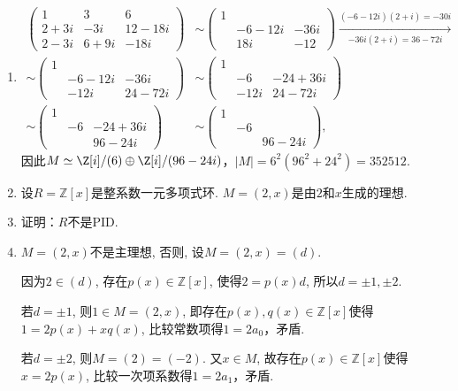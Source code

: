 \begin{enumerate}
    \item[\textbf{证明:}]
    \begin{align*}
        \begin{pmatrix}1&3&6\\2+3i&-3i&12-18i\\2-3i&6+9i&-18i\end{pmatrix}
        &\sim\begin{pmatrix}1& & \\ &-6-12i&-36i\\ &18i&-12\end{pmatrix}
        \xrightarrow[-36i(2+i)=36-72i]{(-6-12i)(2+i)=-30i}\\
        \sim\begin{pmatrix}1& & \\ &-6-12i&-36i\\ &-12i&24-72i\end{pmatrix}
        &\sim\begin{pmatrix}1& & \\ &-6&-24+36i\\ &-12i&24-72i\end{pmatrix}\\
        \sim\begin{pmatrix}1& & \\ &-6&-24+36i\\ & &96-24i\end{pmatrix}
        &\sim\begin{pmatrix}1& & \\ &-6& \\ & &96-24i\end{pmatrix},
    \end{align*}
    因此$M\simeq\Z[i]/(6)\oplus\Z[i]/(96-24i)$，$|M|=6^2(96^2+24^2)=352512$.

    \item[3.5.]
        设$R=\mathbb{Z}[x]$是整系数一元多项式环. $M=(2,x)$是由$2$和$x$生成的理想.
    \item[(a)] 证明：$R$不是PID.
    \item[\textbf{证明:}]
        $M=(2,x)$不是主理想, 否则, 设$M=(2,x)=(d)$.\par
        因为$2\in (d)$, 存在$p(x)\in \mathbb{Z}[x]$, 使得$2=p(x)d$, 
        所以$d=\pm 1, \pm 2$.\par
        若$d=\pm 1$, 则$1\in M=(2,x)$, 
        即存在$p(x), q(x)\in \mathbb{Z}[x]$使得$1=2p(x)+xq(x)$, 
        比较常数项得$1=2a_0$，矛盾.\par
        若$d=\pm 2$, 则$M=(2)=(-2)$. 又$x\in M$, 
        故存在$p(x)\in \mathbb{Z}[x]$使得$x=2p(x)$, 
        比较一次项系数得$1=2a_1$，矛盾. 
            

\end{enumerate}
